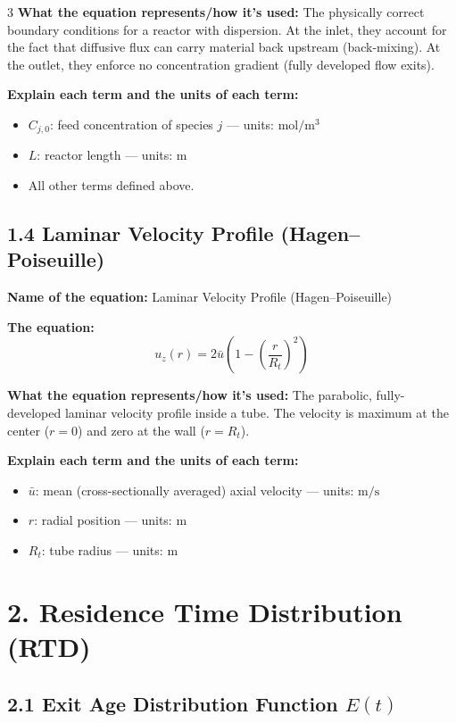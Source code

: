 \documentclass[8pt]{extarticle}
\begin{document}
\begin{multicols*}{3}
\textbf{What the equation represents/how it's used:} The physically correct boundary conditions for a reactor with dispersion. At the inlet, they account for the fact that diffusive flux can carry material back upstream (back-mixing). At the outlet, they enforce no concentration gradient (fully developed flow exits).

\textbf{Explain each term and the units of each term:}
\begin{itemize}
\item \(C_{j,0}\): feed concentration of species \(j\) --- units: \(\mathrm{mol/m^3}\)
\item \(L\): reactor length --- units: \(\mathrm{m}\)
\item All other terms defined above.
\end{itemize}

\subsection*{1.4 Laminar Velocity Profile (Hagen--Poiseuille)}

\textbf{Name of the equation:} Laminar Velocity Profile (Hagen--Poiseuille)

\textbf{The equation:}
\[
u_z(r)=2\bar{u}\left(1-\left(\frac{r}{R_t}\right)^2\right)
\]

\textbf{What the equation represents/how it's used:} The parabolic, fully-developed laminar velocity profile inside a tube. The velocity is maximum at the center (\(r=0\)) and zero at the wall (\(r=R_t\)).

\textbf{Explain each term and the units of each term:}
\begin{itemize}
\item \(\bar{u}\): mean (cross-sectionally averaged) axial velocity --- units: \(\mathrm{m/s}\)
\item \(r\): radial position --- units: \(\mathrm{m}\)
\item \(R_t\): tube radius --- units: \(\mathrm{m}\)
\end{itemize}

\section*{2. Residence Time Distribution (RTD)}

\subsection*{2.1 Exit Age Distribution Function \(E(t)\)}


\end{multicols*}
\end{document}
